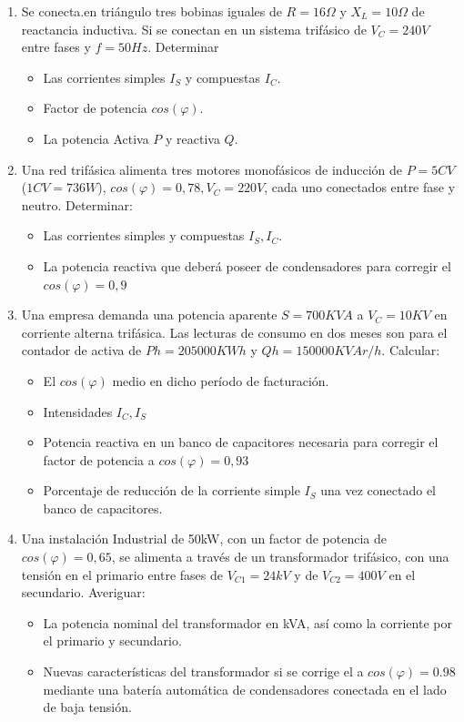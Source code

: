 \documentclass[../main]{subfiles}
\begin{document}
\begin{enumerate}
    \item Se conecta.en triángulo tres bobinas iguales de $R=16\Omega$ y $X_L=10\Omega$ de reactancia inductiva. Si se conectan en un sistema trifásico de $V_C=240V$ entre fases y $f=50Hz$. Determinar
    \begin{itemize}
        \item Las corrientes simples $I_S$ y compuestas $I_C$.
        \item Factor de potencia $cos(\varphi)$.
        \item La potencia Activa $P$ y reactiva $Q$.
    \end{itemize}
    \item Una red trifásica alimenta tres motores monofásicos de inducción de $P=5CV$ ($1CV=736W$), $cos(\varphi)=0,78, V_C=220V$, cada uno conectados entre fase y neutro. Determinar:
    \begin{itemize}
        \item Las corrientes simples y compuestas $I_S,I_C$.
        \item La potencia reactiva que deberá poseer de condensadores  para corregir el $cos(\varphi)=0,9$
    \end{itemize}
    \item Una empresa demanda una potencia aparente $S=700KVA$ a $V_C=10KV$ en corriente alterna trifásica. Las lecturas de consumo en dos meses son para el contador de activa de $Ph=205000KWh$ y $Qh=150000KVAr/h$. Calcular:
    \begin{itemize}
        \item El $cos(\varphi)$ medio en dicho período de facturación.
        \item Intensidades $I_C, I_S$
        \item Potencia reactiva en un banco de capacitores necesaria para corregir el factor de potencia a $cos(\varphi)=0,93$
        \item Porcentaje de reducción de la corriente simple $I_S$ una vez conectado el banco de capacitores.
    \end{itemize}
    \item Una instalación Industrial de 50kW, con un factor de potencia de $cos(\varphi)=0,65$, se alimenta a través de un transformador trifásico, con una tensión en el primario entre fases de $V_{C1}= 24kV$ y de $V_{C2}=400V$ en el secundario. Averiguar:
    \begin{itemize}
        \item La potencia nominal del transformador en kVA, así como la corriente por el primario y secundario.
        \item Nuevas características del transformador si se corrige el a $cos(\varphi)=0.98$ mediante una batería automática de condensadores conectada en el lado de baja tensión.
    \end{itemize}
  \end{enumerate}
\end{document}
